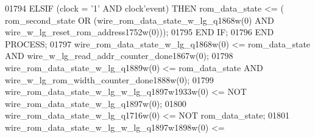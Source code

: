 \begin{DoxyCode}
{01794         \textcolor{keywordflow}{ELSIF} \textcolor{vhdlchar}{(}\textcolor{vhdlchar}{clock} \textcolor{vhdlchar}{=} \textcolor{vhdlchar}{'}\textcolor{vhdllogic}{}\textcolor{vhdllogic}{1}\textcolor{vhdlchar}{'} \textcolor{keywordflow}{AND} \textcolor{vhdlchar}{clock}\textcolor{vhdlchar}{'}\textcolor{vhdlkeyword}{event}\textcolor{vhdlchar}{)} \textcolor{keywordflow}{THEN} \textcolor{vhdlchar}{rom_data_state} \textcolor{vhdlchar}{<=} \textcolor{vhdlchar}{(}\textcolor{vhdlchar}{
      rom_second_state} \textcolor{keywordflow}{OR} \textcolor{vhdlchar}{(}\textcolor{vhdlchar}{wire_rom_data_state_w_lg_q1868w}\textcolor{vhdlchar}{(}\textcolor{vhdllogic}{}\textcolor{vhdllogic}{0}\textcolor{vhdlchar}{)} \textcolor{keywordflow}{AND} \textcolor{vhdlchar}{
      wire_w_lg_reset_rom_address1752w}\textcolor{vhdlchar}{(}\textcolor{vhdllogic}{}\textcolor{vhdllogic}{0}\textcolor{vhdlchar}{)}\textcolor{vhdlchar}{)}\textcolor{vhdlchar}{)};
01795         \textcolor{keywordflow}{END} \textcolor{keywordflow}{IF};
01796     \textcolor{keywordflow}{END} \textcolor{keywordflow}{PROCESS};
01797     \textcolor{vhdlchar}{wire_rom_data_state_w_lg_q1868w}\textcolor{vhdlchar}{(}\textcolor{vhdllogic}{}\textcolor{vhdllogic}{0}\textcolor{vhdlchar}{)} \textcolor{vhdlchar}{<=} \textcolor{vhdlchar}{rom_data_state} \textcolor{keywordflow}{AND} \textcolor{vhdlchar}{
      wire_w_lg_read_addr_counter_done1867w}\textcolor{vhdlchar}{(}\textcolor{vhdllogic}{}\textcolor{vhdllogic}{0}\textcolor{vhdlchar}{)};
01798     \textcolor{vhdlchar}{wire_rom_data_state_w_lg_q1889w}\textcolor{vhdlchar}{(}\textcolor{vhdllogic}{}\textcolor{vhdllogic}{0}\textcolor{vhdlchar}{)} \textcolor{vhdlchar}{<=} \textcolor{vhdlchar}{rom_data_state} \textcolor{keywordflow}{AND} \textcolor{vhdlchar}{
      wire_w_lg_rom_width_counter_done1888w}\textcolor{vhdlchar}{(}\textcolor{vhdllogic}{}\textcolor{vhdllogic}{0}\textcolor{vhdlchar}{)};
01799     \textcolor{vhdlchar}{wire_rom_data_state_w_lg_w_lg_q1897w1933w}\textcolor{vhdlchar}{(}\textcolor{vhdllogic}{}\textcolor{vhdllogic}{0}\textcolor{vhdlchar}{)} \textcolor{vhdlchar}{<=} \textcolor{keywordflow}{NOT} \textcolor{vhdlchar}{
      wire_rom_data_state_w_lg_q1897w}\textcolor{vhdlchar}{(}\textcolor{vhdllogic}{}\textcolor{vhdllogic}{0}\textcolor{vhdlchar}{)};
01800     \textcolor{vhdlchar}{wire_rom_data_state_w_lg_q1716w}\textcolor{vhdlchar}{(}\textcolor{vhdllogic}{}\textcolor{vhdllogic}{0}\textcolor{vhdlchar}{)} \textcolor{vhdlchar}{<=} \textcolor{keywordflow}{NOT} \textcolor{vhdlchar}{rom_data_state};
01801     \textcolor{vhdlchar}{wire_rom_data_state_w_lg_w_lg_q1897w1898w}\textcolor{vhdlchar}{(}\textcolor{vhdllogic}{}\textcolor{vhdllogic}{0}\textcolor{vhdlchar}{)} \textcolor{vhdlchar}{<=} \textcolor{vhdlchar}{
}}
\end{DoxyCode}
